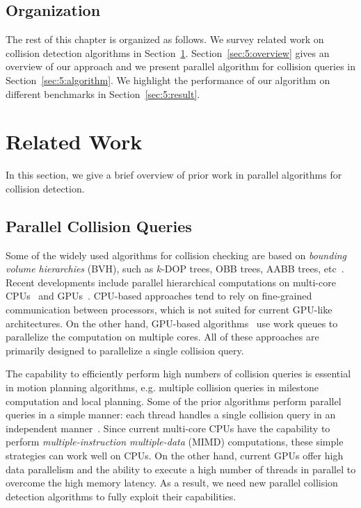 \subsection{Organization}
The rest of this chapter is organized as follows. We survey related work on collision detection
algorithms in Section~\ref{sec:5:related}. Section~\ref{sec:5:overview} gives an overview of our approach and we present parallel algorithm
for collision queries in Section~\ref{sec:5:algorithm}. We highlight the performance of our algorithm on different benchmarks in Section~\ref{sec:5:result}.

\section{Related Work}
\label{sec:5:related}
In this section, we give a brief overview of prior work in parallel algorithms for collision
detection.

\subsection{Parallel Collision Queries}
Some of the widely used algorithms for collision checking are based on \emph{bounding volume hierarchies} (BVH),
such as $k$-DOP trees, OBB trees, AABB trees, etc~\cite{LM03}. Recent developments include parallel hierarchical computations on multi-core CPUs~\cite{Kim08,TMT10-GMOD} and GPUs~\cite{Lauterbach10}. CPU-based approaches tend to rely on fine-grained communication
between processors, which is not suited for current GPU-like architectures. On the other hand, GPU-based
algorithms~\cite{Lauterbach10} use work queues
to parallelize the computation on multiple cores. All of these approaches are primarily designed to parallelize a
single collision query.

The capability to efficiently perform high numbers of collision queries is essential in motion planning algorithms, e.g.
multiple collision queries in milestone computation and local planning. Some of the prior algorithms
perform parallel queries in a simple manner: each thread handles a single collision query in an independent
manner~\cite{Amato99,akinc+2003:prt-p}. Since current multi-core CPUs have the capability to perform \emph{multiple-instruction multiple-data} (MIMD) computations, these simple strategies can work well on CPUs.
On the other hand, current GPUs offer high data parallelism and the ability to execute a high number of threads
in parallel to overcome the high memory latency. As a result, we need new parallel collision detection algorithms
to fully exploit their capabilities.

